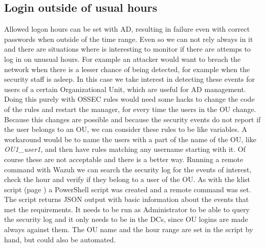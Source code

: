 \subsection{Login outside of usual hours}
Allowed logon hours can be set with AD, resulting in failure even with correct passwords when outside of the time range.
Even so we can not rely always in it and there are situations where is interesting to monitor if there are attemps to log in on unusual hours.
For example an attacker would want to breach the network when there is a lesser chance of being detected, for example when the security staff is asleep.
In this case we take interest in detecting these events for users of a certain Organizational Unit, which are useful for AD management.
\linej
\linej
Doing this purely with OSSEC rules would need some hacks to change the code of the rules and restart the manager, for every time the users in the OU change.
Because this changes are possible and because the security events do not report if the user belongs to an OU, we can consider these rules to be like variables.
A workaround would be to name the users with a part of the name of the OU, like \textit{OU1\_user1}, and then have rules matching any username starting with it.
\linej
\linej
Of course these are not acceptable and there is a better way.
Running a remote command with Wazuh we can search the security log for the events of interest, check the hour and verify if they belong to a user of the OU.
As with the klist script (page \pageref{klist_script_wodle}) a PowerShell script was created and a remote command was set.
The script returns JSON output with basic information about the events that met the requirements.
It needs to be run as Administrator to be able to query the security log and it only needs to be in the DCs, since OU logins are made always against them.
The OU name and the hour range are set in the script by hand, but could also be automated.

